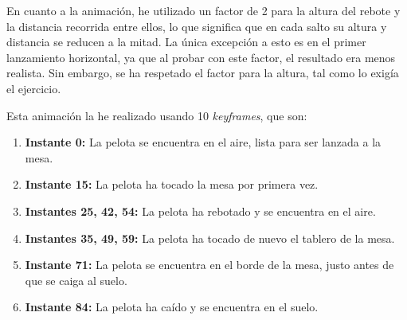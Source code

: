 \documentclass{article}
\begin{document}
\bigskip

En cuanto a la animación, he utilizado un factor de 2 para la altura del rebote y la distancia recorrida entre ellos, lo que significa que en cada salto su altura y distancia se reducen a la mitad. La única excepción a esto es en el primer lanzamiento horizontal, ya que al probar con este factor, el resultado era menos realista. Sin embargo, se ha respetado el factor para la altura, tal como lo exigía el ejercicio.

\bigskip

Esta animación la he realizado usando 10 \textit{keyframes}, que son:

\begin{enumerate}
    \item \textbf{Instante 0:} La pelota se encuentra en el aire, lista para ser lanzada a la mesa.
    \item \textbf{Instante 15:} La pelota ha tocado la mesa por primera vez.
    \item \textbf{Instantes 25, 42, 54:} La pelota ha rebotado y se encuentra en el aire.
    \item \textbf{Instantes 35, 49, 59:} La pelota ha tocado de nuevo el tablero de la mesa.
    \item \textbf{Instante 71:} La pelota se encuentra en el borde de la mesa, justo antes de que se caiga al suelo.
    \item \textbf{Instante 84:} La pelota ha caído y se encuentra en el suelo.
\end{enumerate}

\bigskip

\end{document}
